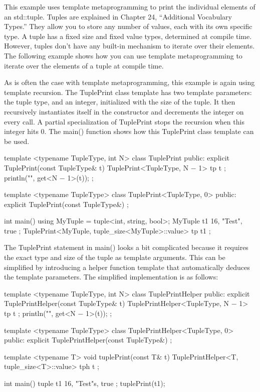 This example uses template metaprogramming to print the individual elements of an std::tuple. Tuples are explained in Chapter 24, “Additional Vocabulary Types.” They allow you to store any number of values, each with its own specific type. A tuple has a fixed size and fixed value types, determined at compile time. However, tuples don’t have any built-in mechanism to iterate over their elements. The following example shows how you can use template metaprogramming to iterate over the elements of a tuple at compile time.

As is often the case with template metaprogramming, this example is again using template recursion. The TuplePrint class template has two template parameters: the tuple type, and an integer, initialized with the size of the tuple. It then recursively instantiates itself in the constructor and decrements the integer on every call. A partial specialization of TuplePrint stops the recursion when this integer hits 0. The main() function shows how this TuplePrint class template can be used.

\begin{cpp}
template <typename TupleType, int N>
class TuplePrint
{
    public:
        explicit TuplePrint(const TupleType& t) {
            TuplePrint<TupleType, N − 1> tp { t };
            println("{}", get<N − 1>(t));
        }
};

template <typename TupleType>
class TuplePrint<TupleType, 0>
{
    public:
        explicit TuplePrint(const TupleType&) { }
};

int main()
{
    using MyTuple = tuple<int, string, bool>;
    MyTuple t1 { 16, "Test", true };
    TuplePrint<MyTuple, tuple_size<MyTuple>::value> tp { t1 };
}
\end{cpp}

The TuplePrint statement in main() looks a bit complicated because it requires the exact type and size of the tuple as template arguments. This can be simplified by introducing a helper function template that automatically deduces the template parameters. The simplified implementation is as follows:

\begin{cpp}
template <typename TupleType, int N>
class TuplePrintHelper
{
    public:
        explicit TuplePrintHelper(const TupleType& t) {
            TuplePrintHelper<TupleType, N − 1> tp { t };
            println("{}", get<N − 1>(t));
        }
};

template <typename TupleType>
class TuplePrintHelper<TupleType, 0>
{
    public:
        explicit TuplePrintHelper(const TupleType&) { }
};

template <typename T>
void tuplePrint(const T& t)
{
    TuplePrintHelper<T, tuple_size<T>::value> tph { t };
}

int main()
{
    tuple t1 { 16, "Test"s, true };
    tuplePrint(t1);
}
\end{cpp}

